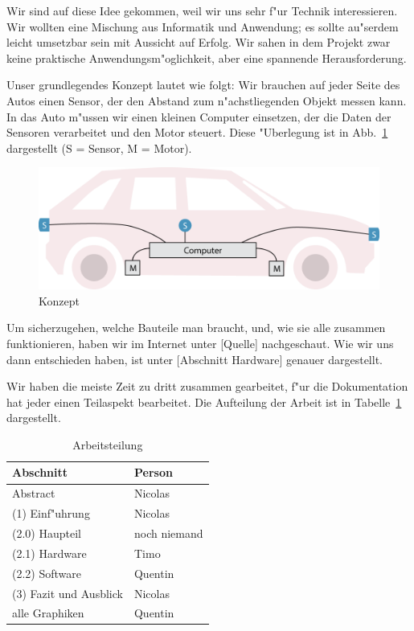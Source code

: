 \documentclass[a4paper,12pt]{article}
\begin{document}
Wir sind auf diese Idee gekommen, weil wir uns sehr f"ur Technik interessieren.
Wir wollten eine Mischung aus Informatik und Anwendung; es sollte au"serdem leicht umsetzbar sein mit Aussicht auf Erfolg.
Wir sahen in dem Projekt zwar keine praktische Anwendungsm"oglichkeit, aber eine spannende Herausforderung.

Unser grundlegendes Konzept lautet wie folgt:
Wir brauchen auf jeder Seite des Autos einen Sensor, der den Abstand zum n"achstliegenden Objekt messen kann.
In das Auto m"ussen wir einen kleinen Computer einsetzen, der die Daten der Sensoren verarbeitet und den Motor steuert.
Diese "Uberlegung ist in Abb.~\ref{Fig1} dargestellt (S = Sensor, M = Motor).

\begin{figure}[h]
	\centering
	\includegraphics[width=12cm]{./media/overview.png}
	\caption{Konzept}
	\label{Fig1}
\end{figure}

Um sicherzugehen, welche Bauteile man braucht, und, wie sie alle zusammen funktionieren, haben wir im Internet unter [Quelle] nachgeschaut.
Wie wir uns dann entschieden haben, ist unter [Abschnitt Hardware] genauer dargestellt.

Wir haben die meiste Zeit zu dritt zusammen gearbeitet, f"ur die Dokumentation hat jeder einen Teilaspekt bearbeitet.
Die Aufteilung der Arbeit ist in Tabelle~\ref{Tab1} dargestellt.

\begin{table}[h]
	\centering
	\begin{tabular}{|l|l|}
	\hline
		Abschnitt & Person \\ \hline
		Abstract & Nicolas \\
		(1) Einf"uhrung & Nicolas \\
		(2.0) Haupteil & noch niemand \\
		(2.1) Hardware & Timo \\
		(2.2) Software & Quentin \\
		(3) Fazit und Ausblick & Nicolas \\
		alle Graphiken & Quentin \\
	\hline
	\end{tabular}
	\caption{Arbeitsteilung}
	\label{Tab1}
\end{table}
\end{document}
